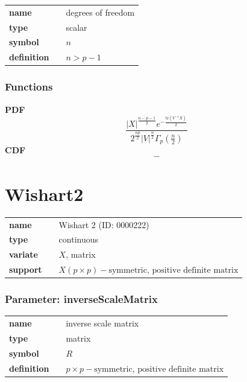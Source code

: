\noindent\begin{tabular}{p{2cm}cl}
\textbf{name} & & degrees of freedom \\
\textbf{type} & & scalar \\
\textbf{symbol} & & $n$  \\
\textbf{definition} & & $n > p-1$
\end{tabular}
\subsubsection*{Functions}

\smallskip \noindent \hspace{.2cm} \textbf{PDF} 
\begin{equation*}\frac{|X|^{\frac{n-p-1}{2}} e^{-\frac{\text{tr}(V^{-1}X)}{2}}}{2^\frac{np}{2}|V|^\frac{n}{2}\Gamma_p(\frac{n}{2})}\end{equation*}
\smallskip \noindent \hspace{.2cm} \textbf{CDF} 
\begin{equation*}-\end{equation*}
\smallskip\section*{Wishart2} 

  \bigskip 

\begin{tabular}{p{2cm}cl}
\textbf{name} & & Wishart 2 (ID: 0000222)\\ 
 
\textbf{type} & & continuous \\ 

\textbf{variate} & & $X$, matrix \\ 

\textbf{support} & & $X(p \times p) - \text{symmetric, positive definite matrix}$
\end{tabular}
\subsubsection*{Parameter: inverseScaleMatrix}

\noindent\begin{tabular}{p{2cm}cl}
\textbf{name} & & inverse scale matrix \\
\textbf{type} & & matrix \\
\textbf{symbol} & & $R$  \\
\textbf{definition} & & $p\times p - \text{symmetric, positive definite matrix}$
\end{tabular}

